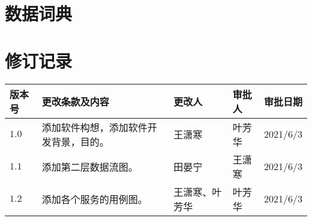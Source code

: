 \begin{appendix}
\section{数据词典}

\section{修订记录}

\centering
\begin{tabular}{|l|l|l|l|l|}
\hline 版本号 & 更改条款及内容 & 更改人 & 审批人 & 审批日期 \\
\hline $1.0$ & 添加软件构想，添加软件开发背景，目的。 & 王潇寒 & 叶芳华 & 2021/6/3\\
\hline $1.1$ & 添加第二层数据流图。 & 田晏宁 & 王潇寒 & 2021/6/3\\
\hline $1.2$ & 添加各个服务的用例图。 & 王潇寒、叶芳华 & 叶芳华 & 2021/6/3\\
\hline
\end{tabular}

\end{appendix}
